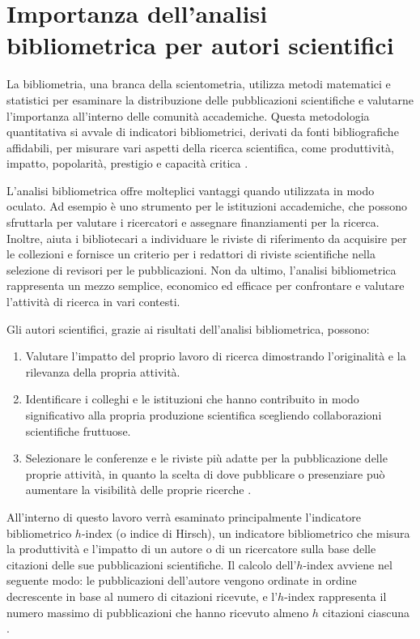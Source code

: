 \section{Importanza dell'analisi bibliometrica per autori scientifici}

La bibliometria, una branca della scientometria, utilizza metodi matematici e statistici per esaminare la distribuzione delle pubblicazioni scientifiche e valutarne l'importanza all'interno delle comunità accademiche. Questa metodologia quantitativa si avvale di indicatori bibliometrici, derivati da fonti bibliografiche affidabili, per misurare vari aspetti della ricerca scientifica, come produttività, impatto, popolarità, prestigio e capacità critica \cite{cassella2011nuovi}.

L'analisi bibliometrica offre molteplici vantaggi quando utilizzata in modo oculato. Ad esempio è uno strumento per le istituzioni accademiche, che possono sfruttarla per valutare i ricercatori e assegnare finanziamenti per la ricerca. Inoltre, aiuta i bibliotecari a individuare le riviste di riferimento da acquisire per le collezioni e fornisce un criterio per i redattori di riviste scientifiche nella selezione di revisori per le pubblicazioni. Non da ultimo, l'analisi bibliometrica rappresenta un mezzo semplice, economico ed efficace per confrontare e valutare l'attività di ricerca in vari contesti.

Gli autori scientifici, grazie ai risultati dell'analisi bibliometrica, possono:
\begin{enumerate}
  \item Valutare l'impatto del proprio lavoro di ricerca dimostrando l'originalità e la rilevanza della propria attività.
  \item Identificare i colleghi e le istituzioni che hanno contribuito in modo significativo alla propria produzione scientifica scegliendo collaborazioni scientifiche fruttuose.
  \item Selezionare le conferenze e le riviste più adatte per la pubblicazione delle proprie attività, in quanto la scelta di dove pubblicare o presenziare può aumentare la visibilità delle proprie ricerche \cite{anziliero2013bibliometria}.
\end{enumerate}

All'interno di questo lavoro verrà esaminato principalmente l'indicatore bibliometrico $h$-index (o indice di Hirsch), un indicatore bibliometrico che misura la produttività e l'impatto di un autore o di un ricercatore sulla base delle citazioni delle sue pubblicazioni scientifiche. Il calcolo dell'$h$-index avviene nel seguente modo: le pubblicazioni dell'autore vengono ordinate in ordine decrescente in base al numero di citazioni ricevute, e l'$h$-index rappresenta il numero massimo di pubblicazioni che hanno ricevuto almeno $h$ citazioni ciascuna \cite{h-index}.

